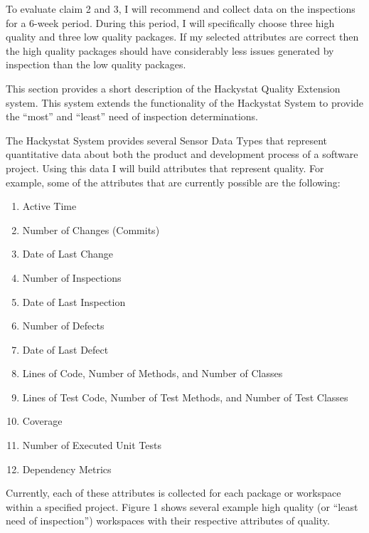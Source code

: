 \documentclass[11pt,twocolumn]{article}
\begin{document}
To evaluate claim 2 and 3, I will recommend and collect data on the
inspections for a 6-week period. During this period, I will specifically
choose three high quality and three low quality packages. If my selected
attributes are correct then the high quality packages should have
considerably less issues generated by inspection than the low quality
packages.

This section provides a short description of the Hackystat Quality
Extension system. This system extends the functionality of the Hackystat
System to provide the ``most'' and ``least'' need of inspection determinations.

The Hackystat System provides several Sensor Data Types that represent
quantitative data about both the product and development process of a
software project. Using this data I will build attributes that represent
quality. For example, some of the attributes that are currently possible
are the following:

\begin{enumerate}
\item Active Time
\item Number of Changes (Commits)
\item Date of Last Change
\item Number of Inspections
\item Date of Last Inspection
\item Number of Defects
\item Date of Last Defect
\item Lines of Code, Number of Methods, and Number of Classes
\item Lines of Test Code, Number of Test Methods, and Number of Test
Classes
\item Coverage
\item Number of Executed Unit Tests
\item Dependency Metrics
\end{enumerate}

Currently, each of these attributes is collected for each package or
workspace within a specified project. Figure 1 shows several example high
quality (or ``least need of inspection'') workspaces with their respective
attributes of quality.
\end{document}
